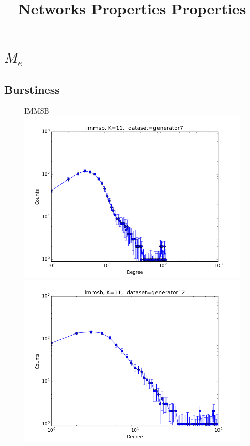 \documentclass[a4paper, 12pt]{article}
\title{Networks Properties Properties}
\begin{document}
\maketitle
\tableofcontents

\clearpage

\section{$M_e$}

\subsection{Burstiness}

\begin{figure}[ht]
    \vspace{-3cm}
	\centering IMMSB\\
	\includegraphics[scale=0.27]{img/expe/1_mmsb/figure_1}
	\endminipage
	\includegraphics[scale=0.27]{img/expe/2_mmsb/figure_1}

\end{figure}
\end{document}
